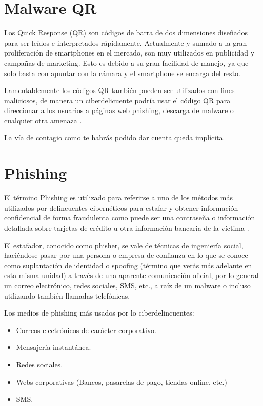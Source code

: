 \documentclass[
  spanish,
  a4paper,
  openany]{book}
\begin{document}
\hypertarget{malware-qr}{%
\section{Malware QR}\label{malware-qr}}

Los Quick Response (QR) son códigos de barra de dos dimensiones diseñados para ser leídos e interpretados rápidamente. Actualmente y sumado a la gran proliferación de smartphones en el mercado, son muy utilizados en publicidad y campañas de marketing. Esto es debido a su gran facilidad de manejo, ya que solo basta con apuntar con la cámara y el smartphone se encarga del resto.

Lamentablemente los códigos QR también pueden ser utilizados con fines maliciosos, de manera un ciberdelicuente podría usar el código QR para direccionar a los usuarios a páginas web phishing, descarga de malware o cualquier otra amenaza \citep{ESET-malware-qr}.

La vía de contagio como te habrás podido dar cuenta queda implícita.

\hypertarget{phishing}{%
\section{Phishing}\label{phishing}}

El término Phishing es utilizado para referirse a uno de los métodos más utilizados por delincuentes cibernéticos para estafar y obtener información confidencial de forma fraudulenta como puede ser una contraseña o información detallada sobre tarjetas de crédito u otra información bancaria de la víctima \citep{INFOSPY-phishing}.

El estafador, conocido como phisher, se vale de técnicas de \href{https://es.wikipedia.org/wiki/Ingeniería_social_(seguridad_informática)}{ingeniería social}, haciéndose pasar por una persona o empresa de confianza en lo que se conoce como suplantación de identidad o spoofing (término que verás más adelante en esta misma unidad) a través de una aparente comunicación oficial, por lo general un correo electrónico, redes sociales, SMS, etc., a raíz de un malware o incluso utilizando también llamadas telefónicas.

Los medios de phishing más usados por lo ciberdelincuentes:

\begin{itemize}
\item
  Correos electrónicos de carácter corporativo.
\item
  Mensajería instantánea.
\item
  Redes sociales.
\item
  Webs corporativas (Bancos, pasarelas de pago, tiendas online, etc.)
\item
  SMS.
\end{itemize}
\end{document}
